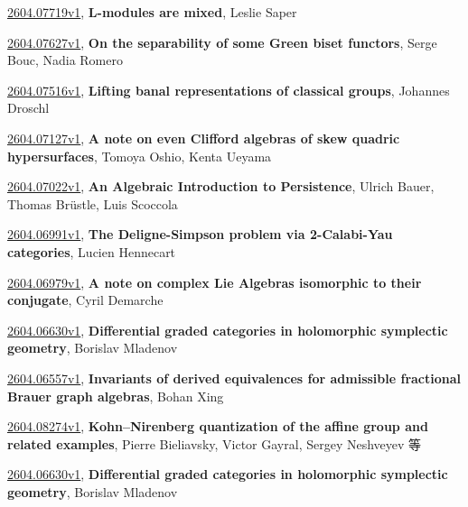 \documentclass[9pt, a4paper]{article}
\theoremstyle{plain}
\theoremstyle{definition}
\theoremstyle{remark}
\newcommand{\arxiv}[3]{\href{https://arxiv.org/abs/#1}{#1}, \textbf{\textcolor{arxivblue}{#2}}, #3}
\begin{document}
\arxiv{2604.07719v1}{L-modules are mixed}{Leslie Saper}

\arxiv{2604.07627v1}{On the separability of some Green biset functors}{Serge Bouc, Nadia Romero}

\arxiv{2604.07516v1}{Lifting banal representations of classical groups}{Johannes Droschl}

\arxiv{2604.07127v1}{A note on even Clifford algebras of skew quadric hypersurfaces}{Tomoya Oshio, Kenta Ueyama}

\arxiv{2604.07022v1}{An Algebraic Introduction to Persistence}{Ulrich Bauer, Thomas Brüstle, Luis Scoccola}

\arxiv{2604.06991v1}{The Deligne-Simpson problem via 2-Calabi-Yau categories}{Lucien Hennecart}

\arxiv{2604.06979v1}{A note on complex Lie Algebras isomorphic to their conjugate}{Cyril Demarche}

\arxiv{2604.06630v1}{Differential graded categories in holomorphic symplectic geometry}{Borislav Mladenov}

\arxiv{2604.06557v1}{Invariants of derived equivalences for admissible fractional Brauer graph algebras}{Bohan Xing}

\arxiv{2604.08274v1}{Kohn--Nirenberg quantization of the affine group and related examples}{Pierre Bieliavsky, Victor Gayral, Sergey Neshveyev 等}

\arxiv{2604.06630v1}{Differential graded categories in holomorphic symplectic geometry}{Borislav Mladenov}

\end{document}

